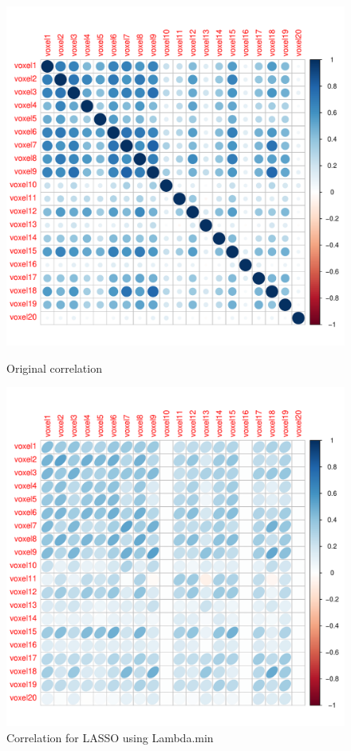 \documentclass[english]{amsart}
\begin{document}
\begin{figure}[H]
  \includegraphics[width=\linewidth]{corrplot_actual.pdf}
  \caption{Original correlation}
\endminipage\hfill
\vspace{-5mm}
  \includegraphics[width=\linewidth]{corrplot.pdf}
  \caption{Correlation for LASSO using Lambda.min}
\endminipage

\end{figure}
\end{document}

